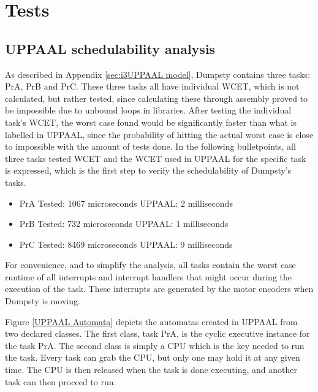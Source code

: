 \chapter{Tests}
\label{chap:Tests}

\section{UPPAAL schedulability analysis}
\label{sec:UPPAAL schedulability}
As described in Appendix \ref{sec:i3UPPAAL model}, Dumpsty contains three tasks: PrA, PrB and PrC. These three tasks all have individual WCET, which is not calculated, but rather tested, since calculating these through assembly proved to be impossible due to unbound loops in libraries. After testing the individual task's WCET, the worst case found would be significantly faster than what is labelled in UPPAAL, since the probability of hitting the actual worst case is close to impossible with the amount of tests done. In the following bulletpoints, all three tasks tested WCET and the WCET used in UPPAAL for the specific task is expressed, which is the first step to verify the schedulability of Dumpsty's tasks.

\begin{itemize}
	\item PrA \tab Tested: 1067 microseconds \tab UPPAAL: 2 milliseconds
	\item PrB \tab Tested: 732  microseconds \tab UPPAAL: 1 milliseconds
	\item PrC \tab	Tested: 8469 microseconds \tab UPPAAL: 9 milliseconds
\end{itemize}

For convenience, and to simplify the analysis, all tasks contain the worst case runtime of all interrupts and interrupt handlers that might occur during the execution of the task. These interrupts are generated by the motor encoders when Dumpsty is moving.

Figure \ref{UPPAAL Automata} depicts the automatas created in UPPAAL from two declared classes. The first class, task PrA, is the cyclic executive instance for the task PrA. The second class is simply a CPU which is the key needed to run the task. Every task can grab the CPU, but only one may hold it at any given time. The CPU is then released when the task is done executing, and another task can then proceed to run.

